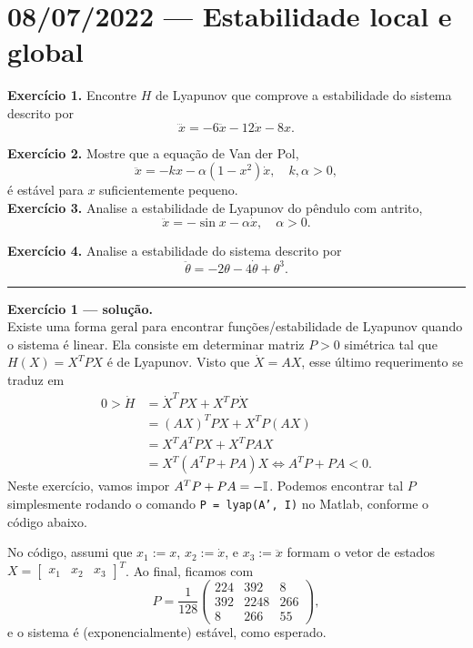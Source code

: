 \section*{08/07/2022 --- Estabilidade local e global}
\noindent\textbf{\sffamily Exercício 1.}
	Encontre $H$ de Lyapunov que comprove a estabilidade do sistema descrito por 
	\[
		\dddot{x} = -6\ddot{x} -12\dot{x} -8x.
	\]

\noindent\textbf{\sffamily Exercício 2.}
	Mostre que a equação de Van der Pol,
	\[
		\ddot{x} = -kx - \alpha(1-x^2)\dot{x},
		\quad k, \alpha>0,
	\]
	é estável para $x$ suficientemente pequeno. \\

\noindent\textbf{\sffamily Exercício 3.}
	Analise a estabilidade de Lyapunov do pêndulo com antrito,
	\[
		\ddot{x} = -\sin x -\alpha \dot{x}, \quad\alpha>0.
	\]

\noindent\textbf{\sffamily Exercício 4.}
	Analise a estabilidade do sistema descrito por
	\[
		\ddot{\theta} = -2\theta -4\dot{\theta} + \theta^3.
	\]

\noindent\rule{\textwidth}{0.5pt}
\noindent
\textbf{\sffamily Exercício 1 --- solução.} \\
	Existe uma forma geral para encontrar funções/estabilidade de Lyapunov quando o sistema é linear. 
	Ela consiste em determinar matriz $P>0$ simétrica tal que $H(X) = X^TPX$ é de Lyapunov. 
	Visto que $\dot{X} = AX$, esse último requerimento se traduz em 
	\begin{align*}
		0 >
		\dot{H} &= \dot{X}^TPX + X^TP\dot{X} \\
		        &= (AX)^TPX + X^TP(AX) \\
		        &= X^TA^TPX + X^TPAX \\
		        &= X^T(A^TP + PA)X 
		\iff
		A^TP + PA < 0.
	\end{align*}
	Neste exercício, vamos impor $A^TP + PA = -\mathbb{I}$.
	Podemos encontrar tal $P$ simplesmente rodando o comando {\tt P = lyap(A', I)} no Matlab, conforme o código abaixo. 
	
	No código, assumi que 
	$x_1 := x$, 
	$x_2 := \dot{x}$, e
	$x_3 := \ddot{x}$ 
	formam o vetor de estados 
	$X = \begin{bmatrix} 
		 	x_1 & x_2 & x_3
	 	 \end{bmatrix}^T$.
 	Ao final, ficamos com		
	\[
		P = 
	    \frac{1}{128}
	    \begin{pmatrix}
	    	224 &  392 & 8 \\
	    	392  & 2248 & 266 \\
	    	8    &  266 & 55
	    \end{pmatrix},	    
	\]
	e o sistema é (exponencialmente) estável, como esperado. \\

